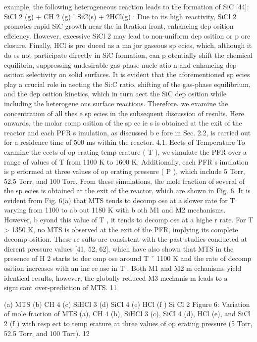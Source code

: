 \documentclass[10pt, letterpaper]{article}
\begin{document}
example, the following heterogeneous reaction leads to the formation of SiC [44]:
SiCl
2
(g) + CH
2
(g)
!
SiC(s) + 2HCl(g)
:
Due to its high reactivity, SiCl
2
promotes rapid SiC growth near the inltration front, enhancing dep osition
effciency. However, excessive SiCl
2
may lead to non-uniform dep osition or p ore closure. Finally, HCl is
pro duced as a ma jor gaseous sp ecies, which, although it do es not participate directly in SiC formation,
can p otentially shift the chemical equilibria, suppressing undesirable gas-phase nucle atio n and enhancing
dep osition selectivity on solid surfaces.
It is evident that the aforementioned sp ecies play a crucial role in aecting the Si:C ratio, shifting of the
gas-phase equilibrium, and the dep osition kinetics, which in turn aect the SiC dep osition while including
the heterogene ous surface reactions. Therefore, we examine the concentration of all thes e sp ecies in the
subsequent discussion of results. Here onwards, the molar comp osition of the sp ec ie s is obtained at the exit
of the reactor and each PFR s imulation, as discussed b e fore in Sec. 2.2, is carried out for a residence time
of 500 ms within the reactor.
4.1. Eects of Temperature
To examine the eects of op erating temp erature (
T
), we simulate the PFR over a range of values of
T
from 1100 K to 1600 K. Additionally, each PFR s imulation is p erformed at three values of op erating pressure
(
P
), which include 5 Torr, 52.5 Torr, and 100 Torr. From these simulations, the mole fraction of several of
the sp ecies is obtained at the exit of the reactor, which are shown in Fig. 6.
It is evident from Fig. 6(a) that MTS tends to decomp ose at a slower rate for
T
varying from 1100 to
ab out 1180 K with b oth M1 and M2 mechanisms. However, b eyond this value of
T
, it tends to decomp ose
at a highe r rate. For
T >
1350 K, no MTS is observed at the exit of the PFR, implying its complete
decomp osition. These re sults are consistent with the past studies conducted at dierent pressure values
[41, 52, 62], which have also shown that MTS in the presence of H
2
starts to dec omp ose around
T
ˇ
1100
K and the rate of decomp osition increases with an inc re ase in
T
. Both M1 and M2 m echanisms yield
identical results, however, the globally reduced M3 mechanis m leads to a signicant over-prediction of MTS.
11


(a) MTS
(b) CH
4
(c) SiHCl
3
(d) SiCl
4
(e) HCl
(f ) Si Cl
2
Figure 6: Variation of mole fraction of MTS (a), CH
4
(b), SiHCl
3
(c), SiCl
4
(d), HCl (e), and SiCl
2
(f ) with resp ect to
temp erature at three values of op erating pressure (5 Torr, 52.5 Torr, and 100 Torr).
12
\end{document}
